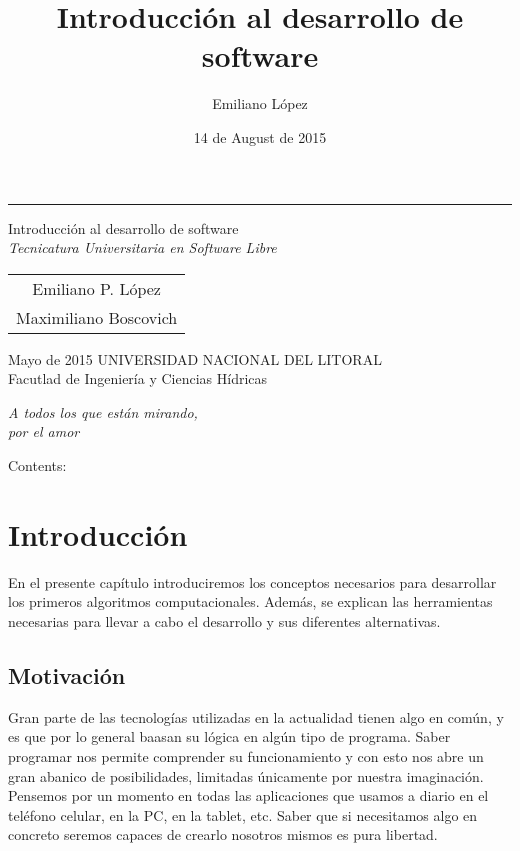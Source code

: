 \documentclass[a4paper,12pt,spanish]{sphinxmanual}
\title{Introducción al desarrollo de software}
\date{14 de August de 2015}
\author{Emiliano López}
\newcommand{\sphinxlogo}{}
\begin{document}

\begin{titlepage}%
    \let\footnotesize\small
    \let\footnoterule\relax
    \rule{\textwidth}{1pt}%
    \begin{flushright}%
      \sphinxlogo%
      \vspace{15 mm}
      {\rm\Huge Introducción al desarrollo de software\\ }
      {\em\large Tecnicatura Universitaria en Software Libre}
      \vfill
      {
        \begin{tabular}[t]{c}
          \large Emiliano P. López \\
          \large Maximiliano Boscovich
        \end{tabular}
        \par}
      \vfill\vfill
      {\large
        Mayo de 2015
       \vfill
       UNIVERSIDAD NACIONAL DEL LITORAL\\
          Facutlad de Ingeniería y Ciencias Hídricas\\
      }%
    \end{flushright}%
  \end{titlepage}%
  \cleardoublepage%
  \label{pre:dedication}
  \vspace*{\fill}
  \begin{flushright}
    \emph{A todos los que están mirando,\\por el amor}
  \end{flushright}
  \vspace{\fill}

\tableofcontents
{}\label{index::doc}


Contents:


\chapter{Introducción}
\label{Unidad01:introduccion}\label{Unidad01::doc}\label{Unidad01:introduccion-al-desarrollo-de-software}
En el presente capítulo introduciremos los conceptos necesarios para
desarrollar los primeros algoritmos computacionales. Además, se explican
las herramientas necesarias para llevar a cabo el desarrollo y sus
diferentes alternativas.


\section{Motivación}
\label{Unidad01:motivacion}
Gran parte de las tecnologías utilizadas en la actualidad tienen algo en
común, y es que por lo general baasan su lógica en algún tipo de
programa. Saber programar nos permite comprender su funcionamiento y con
esto nos abre un gran abanico de posibilidades, limitadas únicamente por
nuestra imaginación. Pensemos por un momento en todas las aplicaciones
que usamos a diario en el teléfono celular, en la PC, en la tablet, etc.
Saber que si necesitamos algo en concreto seremos capaces de crearlo
nosotros mismos es pura libertad.
\end{document}
